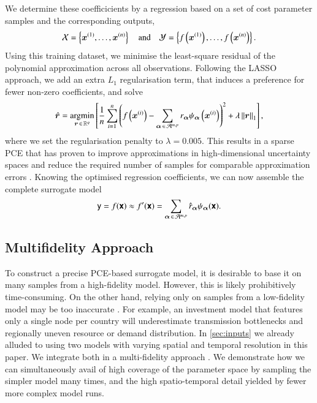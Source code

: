 We determine these coefficicients by a regression based on
a set of cost parameter samples
and the corresponding outputs,
\begin{equation}
    \mathcal{X} = \left\{ \bm x^{(1)},\dots,\bm x^{(n)} \right\} \quad\text{and}\quad 
    \mathcal{Y} = \left\{ f\left(\bm x^{(1)}\right),\dots,f\left(\bm x^{(n)}\right) \right\}.
\end{equation}
Using this training dataset, we minimise the least-square residual of the polynomial approximation across all observations.
Following the LASSO approach, we add an extra $L_1$ regularisation term,
that induces a preference for fewer non-zero coefficients, and solve
\begin{equation}
    \hat{\bm{r}} = \operatorname*{\arg\!\min}_{\bm{r} \,\in\, \mathbb{R}^q} \left[ \frac{1}{n} \sum_{i=1}^n \left(
        f\left(\bm x^{(i)}\right) - \sum_{{\bm{\alpha}} \,\in\, \mathcal{A}^{m,p}} r_{\bm{\alpha}} \psi_{\bm{\alpha}}\left(\bm x^{(i)}\right)
        \right)^2  + \lambda \left\lVert\bm{r}\right\rVert_1 \right],
        \label{eq:regression}
    \end{equation}
where we set the regularisation penalty to $\lambda=0.005$.
This results in a sparse PCE that has proven to
improve approximations in high-dimensional uncertainty spaces
and reduce the required number of samples for comparable approximation errors \cite{gratiet_metamodel-based_2015}.
Knowing the optimised regression coefficients, we can now assemble the complete surrogate model
\begin{equation}
    \mathsf{y} = f(\boldsymbol{\mathsf{x}}) \approx f'(\boldsymbol{\mathsf{x}}) = \sum_{{\bm{\alpha}} \,\in\, \mathcal{A}^{m,p}} \hat{r}_{\bm{\alpha}} \psi_{\bm{\alpha}} (\boldsymbol{\mathsf{x}}).
\end{equation}

\subsection{Multifidelity Approach}
\label{sec:multifidelity}


To construct a precise PCE-based surrogate model, it is desirable to base it
on many samples from a high-fidelity model.
However, this is likely prohibitively time-consuming.
On the other hand, relying only on samples from a
low-fidelity model may be too inaccurate \cite{ng_multifidelity_2012}.
For example, an investment model that features only a single node per country
will underestimate transmission bottlenecks and regionally uneven resource or demand distribution.
In \cref{sec:inputs} we already alluded to using
two models with varying spatial and temporal resolution in this paper.
We integrate both in a multi-fidelity approach \cite{ng_multifidelity_2012,palar_multi-fidelity_2016}.
We demonstrate how we can
simultaneously avail of high coverage of the parameter space by sampling
the simpler model many times, and the high spatio-temporal detail yielded by fewer more complex model runs.

